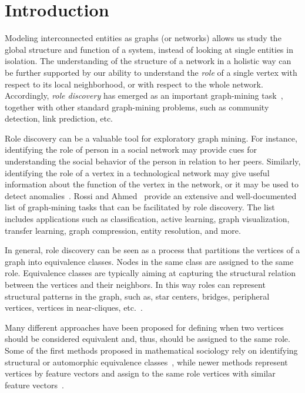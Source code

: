 \section{Introduction}


Modeling interconnected entities as graphs (or networks)
allows us study the global structure and function of a system,
instead of looking at single entities in isolation.
The understanding of the structure of a network in a holistic way
can be further supported by our ability to 
understand the \emph{role} of a single vertex 
with respect to its local neighborhood, 
or with respect to the whole network.
Accordingly, 
\emph{role discovery} 
has emerged as an important
graph-mining task~\cite{gilpin2013guided,danilevsky2013entity,henderson2012rolx,rossi2015role,ruan2014simultaneous,yang2015network,zhao2013inferring}, 
together with other standard graph-mining problems, 
such as community detection, link prediction,  etc.

Role discovery can be a valuable tool for exploratory graph mining. 
For instance, identifying the role of person in a social network 
may provide cues for understanding the social behavior of the person
in relation to her peers. 
Similarly, identifying the role of a vertex in a technological network 
may give useful information about the function of the vertex in the network, 
or it may be used to detect anomalies~\cite{rossi2013multi}.
Rossi and Ahmed~\cite{rossi2015role}
provide an extensive and well-documented list of graph-mining tasks
that can be facilitated by role discovery. 
The list includes applications such as 
classification, active learning, graph visualization, 
transfer learning, graph compression, entity resolution, and more.

In general, role discovery can be seen as a process that
partitions the vertices of a graph into equivalence classes.
Nodes in the same class are assigned to the same role. 
Equivalence classes are typically
aiming at capturing the structural relation between the vertices and their neighbors. 
In this way roles can represent 
structural patterns in the graph, 
such as, star centers, bridges, peripheral vertices, vertices in near-cliques, etc.~\cite{henderson2012rolx}.

Many different approaches have been proposed
for defining when two vertices should be considered equivalent and, thus,  
should be assigned to the same role. 
Some of the first methods proposed in mathematical sociology
rely on identifying structural or automorphic equivalence 
classes~\cite{everett1994regular,lorrain1971structural}, 
while newer methods 
represent vertices by feature vectors 
and assign to the same role vertices with similar 
feature vectors~\cite{henderson2012rolx,rossi2015role,rossi2013modeling,zhao2013inferring}.

